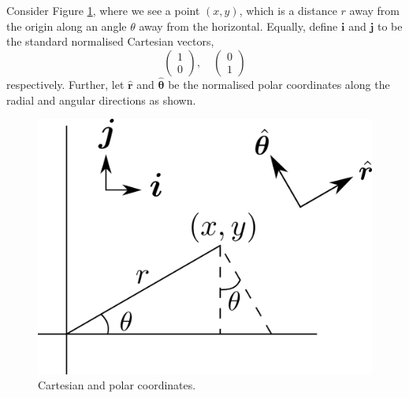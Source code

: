 \documentclass[]{article}
\newcommand{\myvec}[1]{\ensuremath{\begin{pmatrix}#1\end{pmatrix}}}
\newcommand{\bb}{\begin{equation}}
\newcommand{\ee}{\end{equation}}
\newcommand{\fig}[1]{Figure \ref{#1}}
\newcommand{\ttp}{.45\textwidth}
\begin{document}
Consider \fig{Polars}, where we see a point $(x,y)$, which is a distance $r$ away from the origin along an angle $\theta$ away from the horizontal. Equally, define $\bm{i}$ and $\bm{j}$ to be the standard normalised Cartesian vectors,
\bb
\myvec{1\\0}, \quad\myvec{0\\1}
\ee
respectively. Further, let $\hat{\bm{r}}$ and $\hat{\bm{\theta}}$ be the normalised polar coordinates along the radial and angular directions as shown.
\begin{figure}[h!!!tb]
\centering
\includegraphics[width=\ttp]{../../Pictures/Polars.png}
\caption{\label{Polars} Cartesian and polar coordinates.}
\end{figure}
\end{document}
